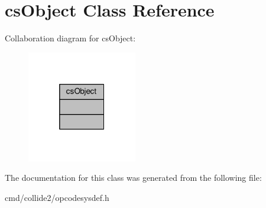 \hypertarget{classcsObject}{}\section{cs\+Object Class Reference}
\label{classcsObject}


Collaboration diagram for cs\+Object\+:
\nopagebreak
\begin{figure}[H]
\begin{center}
\leavevmode
\includegraphics[width=136pt]{d6/da7/classcsObject__coll__graph}
\end{center}
\end{figure}


The documentation for this class was generated from the following file\+:\begin{DoxyCompactItemize}
\item 
cmd/collide2/opcodesysdef.\+h\end{DoxyCompactItemize}
